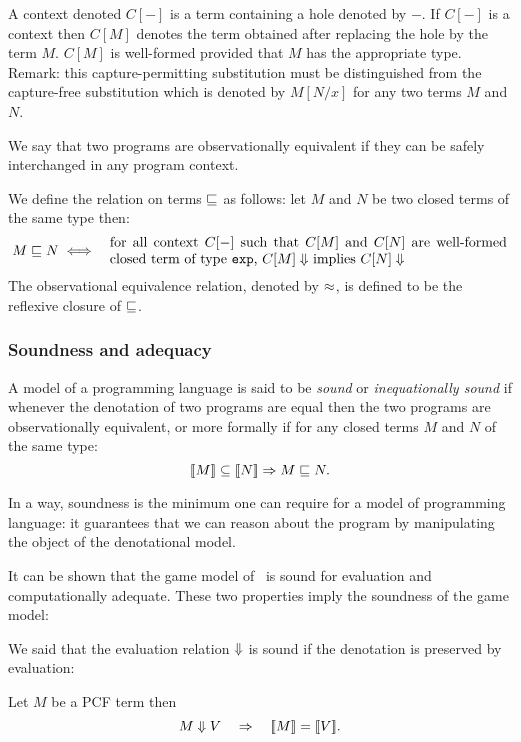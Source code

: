 A context denoted $C[-]$ is a term containing a hole denoted by $-$.
If $C[-]$ is a context then $C[M]$ denotes the term obtained after
replacing the hole by the term $M$. $C[M]$ is well-formed provided
that $M$ has the appropriate type. Remark: this capture-permitting
substitution must be distinguished from the capture-free
substitution which is denoted by $M[N/x]$ for any two terms $M$ and
$N$.

We say that two programs are observationally equivalent if they
can be safely interchanged in any program context.
\begin{dfn}
We define the relation on terms $\sqsubseteq$ as follows: let $M$ and
$N$ be two closed terms of the same type then:
\begin{eqnarray*}
M \obspre N &\iff& \parbox{10cm}{for all context $C[-]$ such that
                $C[M]$ and $C[N]$ are well-formed closed term of type \texttt{exp},
                    $C[M] \eval$ implies $C[N] \eval$}
\end{eqnarray*}
The observational equivalence relation, denoted by $\approx$, is defined to be the reflexive closure of
$\sqsubseteq$.
\end{dfn}


\subsubsection{Soundness and adequacy}
A model of a programming language is said to be \emph{sound} or
\emph{inequationally sound} if whenever the denotation of two
programs are equal then the two programs are observationally
equivalent, or more formally if for any closed terms $M$ and $N$ of
the same type:
$$ {[\![ M ]\!]} \subseteq {[\![N ]\!]} \Rightarrow M \sqsubseteq N.$$

In a way, soundness is the minimum one can require for a model of
programming language: it guarantees that we can reason about the
program by manipulating the object of the denotational model.

It can be shown that the game model of \pcf\ is sound for evaluation
and computationally adequate. These two properties imply the
soundness of the game model:

We said that the evaluation relation $\Downarrow$ is sound if the
denotation is preserved by evaluation:
\begin{lem}
\label{lem:evalsoundness}
 Let $M$ be a PCF term then
$$M \Downarrow V \quad \Rightarrow \quad {[\![M ]\!]} = {[\![ V ]\!]}.$$
\end{lem}


